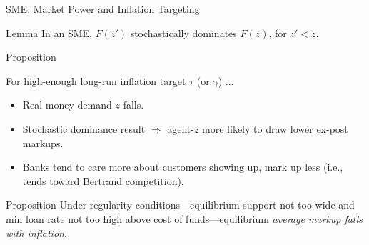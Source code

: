 \documentclass[10pt,english,slidetop,compress,
              blue,mathserif,color=option]{beamer}
\theoremstyle{plain}
\theoremstyle{definition}
\begin{document}
\begin{frame}{SME: Market Power and Inflation Targeting}

    \begin{block}{Lemma}
        In an SME, $F(z')$ stochastically dominates $F(z)$, for $z' < z$.
    \end{block} 

    \bigskip

    \begin{block}{Proposition}

        For high-enough long-run inflation target $\tau$ (or $\gamma$) ...
        \begin{itemize}
            \item Real money demand $z$ falls.
            \item Stochastic dominance result $\Rightarrow$ agent-$z$ more likely to draw lower ex-post markups.
            \item Banks tend to care more about customers showing up, mark up less (i.e., tends toward Bertrand competition).
        \end{itemize}
    \end{block}

    \bigskip

    \begin{block}{Proposition}
        Under regularity conditions---equilibrium support not too wide and min loan rate not too high above cost of funds---equilibrium \emph{average markup falls with inflation}.
    \end{block}

\end{frame}
\end{document}
